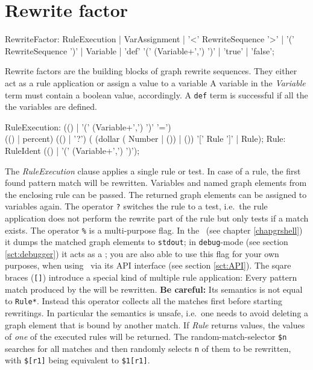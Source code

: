 \section{Rewrite factor}

\begin{rail} 
  RewriteFactor: 
    RuleExecution |
    VarAssignment |
    '<' RewriteSequence '>' | 
    '(' RewriteSequence ')' |
    Variable |
    'def' '(' (Variable+',') ')' |
    'true' |
    'false';
\end{rail}\indexmain{\texttt{<>}}
Rewrite factors are the building blocks of graph rewrite sequences.
They either act as a rule application or assign a value to a variable
A variable in the \emph{Variable} term must contain a boolean value, accordingly.
A \texttt{def} term is successful if all the the variables are defined.

\begin{rail}    
  RuleExecution: (() | '(' (Variable+',') ')' '=') \\ (() | percent) (() | '?') ( (dollar ( Number | ()) | ()) '[' Rule ']' | Rule);   
  Rule: RuleIdent (() | '(' (Variable+',') ')');
\end{rail}  
The \emph{RuleExecution} clause applies a single rule or test.
In case of a rule, the first found pattern match will be rewritten.
Variables and named graph elements from the enclosing rule can be passed.
The returned graph elements can be assigned to variables again.
The operator \texttt{?} switches the rule to a test, i.e.\ the rule application does not perform the rewrite part of the rule but only tests if a match exists.
The operator \texttt{\%} is a multi-purpose flag. In the \GrShell\ (see chapter \ref{chapgrshell}) it dumps the matched graph elements to \texttt{stdout}; in \texttt{debug}-mode (see section \ref{sct:debugger}) it acts as a ; you are also able to use this flag for your own purposes, when using \GrG\ via its API interface (see section \ref{sct:API}).
The sqare braces (\texttt{[]}) introduce a special kind of multiple rule application: Every pattern match produced by the will be rewritten. \textbf{Be careful:} Its semantics is not equal to \texttt{Rule*}. Instead this operator collects all the matches first before starting rewritings. In particular the semantics is unsafe, i.e.\ one needs to avoid deleting a graph element that is bound by another match. If \emph{Rule} returns values, the values of \emph{one} of the executed rules will be returned.
The random-match-selector \texttt{\$n} searches for all matches and then randomly selects \texttt{n} of them to be rewritten, with \texttt{\$[r1]} being equivalent to \texttt{\$1[r1]}.

